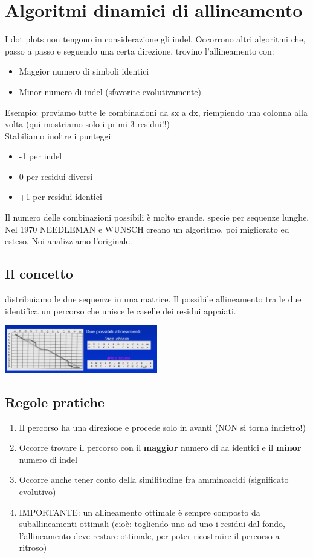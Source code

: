 \documentclass{article}
\begin{document}
\section{Algoritmi dinamici di allineamento}
I dot plots non tengono in considerazione gli indel. Occorrono altri
algoritmi che, passo a passo e seguendo una certa direzione, trovino
l'allineamento con:
\begin{itemize}
    \item Maggior numero di simboli identici
    \item Minor numero di indel (sfavorite evolutivamente)
\end{itemize}
Esempio: proviamo tutte le combinazioni da sx a dx, riempiendo una colonna alla volta (qui mostriamo solo i primi 3 residui!!)\\
Stabiliamo inoltre i punteggi:
\begin{itemize}
    \item -1 per indel
    \item 0 per residui diversi
    \item +1 per residui identici
\end{itemize}
Il numero delle combinazioni possibili è molto grande, specie per
sequenze lunghe. Nel 1970 NEEDLEMAN e WUNSCH creano un algoritmo, poi
migliorato ed esteso. Noi analizziamo l'originale.
\subsection{Il concetto}
distribuiamo le due sequenze in una matrice. Il possibile
allineamento tra le due identifica un percorso che unisce le caselle dei
residui appaiati.
\begin{center}
    \includegraphics[width=0.5\textwidth]{figures/algo.png}
\end{center}
\subsection{Regole pratiche}
\begin{enumerate}
    \item Il percorso ha una direzione e procede solo in avanti (NON si torna indietro!)
    \item Occorre trovare il percorso con il \textbf{maggior} numero di aa identici e il \textbf{minor} numero di indel
    \item Occorre anche tener conto della similitudine fra amminoacidi (significato evolutivo)
    \item IMPORTANTE: un allineamento ottimale è sempre
    composto da suballineamenti ottimali (cioè: togliendo uno
    ad uno i residui dal fondo, l'allineamento deve restare
    ottimale, per poter ricostruire il percorso a ritroso)
\end{enumerate}
\end{document}
